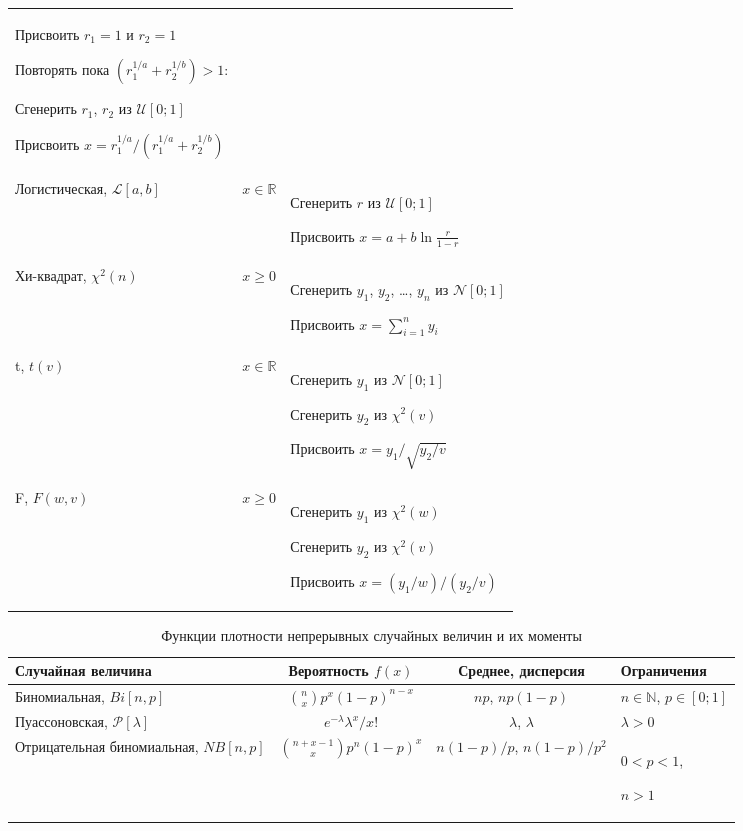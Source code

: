 \begin{table}[h]
\begin{tabular}{p{5cm}p{2cm}p{9cm}}
Присвоить $r_1=1$ и $r_2=1$

Повторять пока $(r_1^{1/a}+r_2^{1/b}) > 1$:

\hspace{0.5cm} Сгенерить $r_1$, $r_2$ из $\mathcal{U}[0;1]$

Присвоить $x=r_1^{1/a}/(r_1^{1/a}+r_2^{1/b})$ \\

Логистическая, $\mathcal{L}[a,b]$ & $x\in \mathbb{R}$ & Сгенерить $r$ из $\mathcal{U}[0;1]$ 

Присвоить $x=a+b\ln \frac{r}{1-r}$ \\ 
Хи-квадрат, $\chi^2(n)$ & $x\geq 0$ & Сгенерить $y_1$, $y_2$, \ldots, $y_n$ из $\mathcal{N}[0;1]$

Присвоить $x=\sum_{i=1}^n y_i$\\ 
t, $t(v)$ & $x\in \mathbb{R}$ & Сгенерить $y_1$ из $\mathcal{N}[0;1]$

Сгенерить $y_2$ из $\chi^2(v)$

Присвоить $x=y_1/\sqrt{y_2/v}$ \\ 
F, $F(w,v)$ & $x \geq 0$ & Сгенерить $y_1$ из $\chi^2(w)$

Сгенерить $y_2$ из $\chi^2(v)$

Присвоить $x=(y_1/w)/(y_2/v)$ \\
\hline
\hline 
\end{tabular}
\end{table}


\begin{table}[h]
\caption{\label{tab:density2}  Функции плотности непрерывных случайных величин и их моменты}
\begin{tabular}{p{5cm}ccp{3cm}}
\hline 
\hline
Случайная величина & Вероятность $f(x)$ & Среднее, дисперсия & Ограничения\\ 
\hline 
Биномиальная, $Bi[n,p]$ & $\binom{n}{x}p^x(1-p)^{n-x}$ & $np$, $np(1-p)$ & $n\in \mathbb{N}$, $p\in[0;1]$ \\
Пуассоновская, $\mathcal{P}[\lambda]$ & $e^{-\lambda}\lambda^x/x!$ & $\lambda$, $\lambda$ & $\lambda>0$ \\
Отрицательная биномиальная, $NB[n,p]$ & $\binom{n+x-1}{x}p^n(1-p)^x$ & $n(1-p)/p$, $n(1-p)/p^2$ & $0<p<1$, 

$n>1$\\
\hline
\hline
\end{tabular} 
\end{table}


